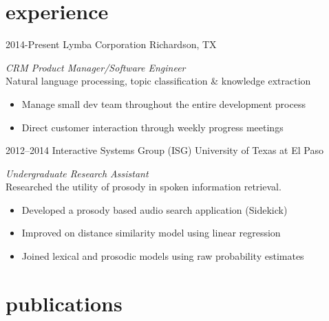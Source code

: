 \documentclass[]{friggeri-cv} %
\begin{document}
\section{experience }

\begin{entrylist}
\entry
{2014-Present}
{Lymba Corporation}
{Richardson, TX}
{\emph{CRM Product Manager/Software Engineer} \\
Natural language processing, topic classification \& knowledge extraction
\begin{itemize}
\item Manage small dev team throughout the entire development process
\end{itemize}
\begin{itemize}
\item Direct customer interaction through weekly progress meetings
\end{itemize}}
\entry
{2012--2014}
{Interactive Systems Group  {\normalfont (ISG)}}
{University of Texas at El Paso}
{\emph{Undergraduate Research Assistant} \\
Researched the utility of prosody in spoken information retrieval.
\begin{itemize}
\item %
Developed a prosody based audio search application (Sidekick)
\end{itemize}
\begin{itemize}
\item Improved on distance similarity model using linear regression
\end{itemize}
\begin{itemize}
\item Joined lexical and prosodic models using raw probability estimates
\end{itemize}}
\end{entrylist}


\section{publications}
\end{document}
